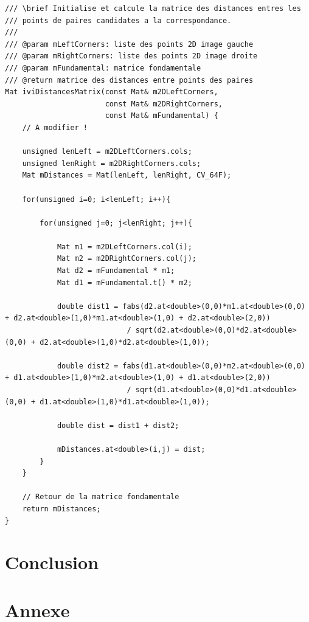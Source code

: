 \documentclass[a4paper,11pt]{article}
\begin{document}
\begin{lstlisting}[caption=Fontion de calcul des distances]
/// \brief Initialise et calcule la matrice des distances entres les
/// points de paires candidates a la correspondance.
///
/// @param mLeftCorners: liste des points 2D image gauche
/// @param mRightCorners: liste des points 2D image droite
/// @param mFundamental: matrice fondamentale
/// @return matrice des distances entre points des paires
Mat iviDistancesMatrix(const Mat& m2DLeftCorners,
                       const Mat& m2DRightCorners,
                       const Mat& mFundamental) {
    // A modifier !

    unsigned lenLeft = m2DLeftCorners.cols;
    unsigned lenRight = m2DRightCorners.cols;
    Mat mDistances = Mat(lenLeft, lenRight, CV_64F);

    for(unsigned i=0; i<lenLeft; i++){

        for(unsigned j=0; j<lenRight; j++){

            Mat m1 = m2DLeftCorners.col(i);
            Mat m2 = m2DRightCorners.col(j);
            Mat d2 = mFundamental * m1;
            Mat d1 = mFundamental.t() * m2;

            double dist1 = fabs(d2.at<double>(0,0)*m1.at<double>(0,0) + d2.at<double>(1,0)*m1.at<double>(1,0) + d2.at<double>(2,0))
                            / sqrt(d2.at<double>(0,0)*d2.at<double>(0,0) + d2.at<double>(1,0)*d2.at<double>(1,0));

            double dist2 = fabs(d1.at<double>(0,0)*m2.at<double>(0,0) + d1.at<double>(1,0)*m2.at<double>(1,0) + d1.at<double>(2,0))
                            / sqrt(d1.at<double>(0,0)*d1.at<double>(0,0) + d1.at<double>(1,0)*d1.at<double>(1,0));

            double dist = dist1 + dist2;

            mDistances.at<double>(i,j) = dist;
        }
    }

    // Retour de la matrice fondamentale
    return mDistances;
}
\end{lstlisting}



\section{Conclusion}



\section{Annexe}
\end{document}
